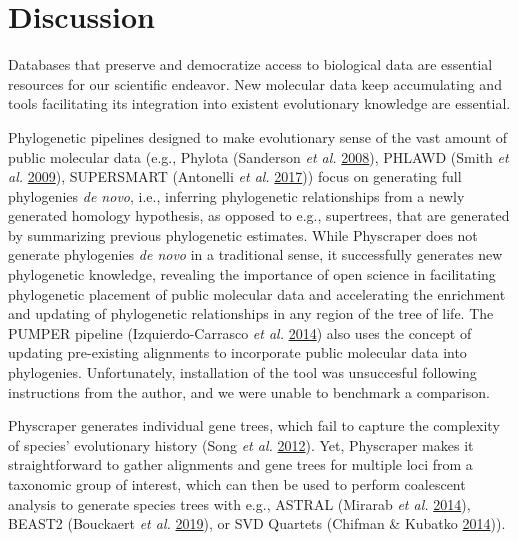 \documentclass[]{article}
\begin{document}
\hypertarget{discussion}{%
\section{Discussion}\label{discussion}}

Databases that preserve and democratize access to biological data
are essential resources for our scientific endeavor.
New molecular data keep accumulating and tools facilitating its integration into existent evolutionary knowledge are essential.

Phylogenetic pipelines designed to make evolutionary sense of the vast amount of public molecular data (e.g., Phylota (Sanderson \emph{et al.} \protect\hyperlink{ref-sanderson2008phylota}{2008}), PHLAWD (Smith \emph{et al.} \protect\hyperlink{ref-smith2009mega}{2009}), SUPERSMART (Antonelli \emph{et al.} \protect\hyperlink{ref-antonelli2017toward}{2017})) focus on generating full phylogenies \emph{de novo}, i.e., inferring phylogenetic relationships from a newly generated homology hypothesis, as opposed to e.g., supertrees, that are generated by summarizing previous phylogenetic estimates.
While Physcraper does not generate phylogenies \emph{de novo} in a traditional sense,
it successfully generates new phylogenetic knowledge, revealing the importance of
open science in facilitating phylogenetic placement of public molecular data and accelerating the enrichment and updating of phylogenetic relationships in any region of the tree of life.
The PUMPER pipeline (Izquierdo-Carrasco \emph{et al.} \protect\hyperlink{ref-izquierdo2014pumper}{2014}) also uses the concept of updating
pre-existing alignments to incorporate public molecular data into phylogenies. Unfortunately, installation of the tool was unsuccesful following instructions from the author, and we were unable to benchmark a comparison.

Physcraper generates individual gene trees, which fail to capture the complexity of species' evolutionary history (Song \emph{et al.} \protect\hyperlink{ref-song2012resolving}{2012}). Yet, Physcraper makes it straightforward to gather alignments and gene trees for multiple loci from a taxonomic group of interest, which can then be used to perform coalescent analysis to generate species trees with e.g., ASTRAL (Mirarab \emph{et al.} \protect\hyperlink{ref-mirarab2014astral}{2014}), BEAST2 (Bouckaert \emph{et al.} \protect\hyperlink{ref-bouckaert2019beast}{2019}), or SVD Quartets (Chifman \& Kubatko \protect\hyperlink{ref-chifman2014quartet}{2014})).
\end{document}
